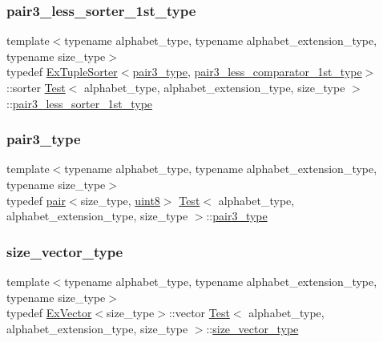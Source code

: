 \subsubsection{\texorpdfstring{pair3\+\_\+less\+\_\+sorter\+\_\+1st\+\_\+type}{pair3\_less\_sorter\_1st\_type}}
{\footnotesize\ttfamily template$<$typename alphabet\+\_\+type, typename alphabet\+\_\+extension\+\_\+type, typename size\+\_\+type$>$ \\
typedef \hyperlink{struct_ex_tuple_sorter}{Ex\+Tuple\+Sorter}$<$\hyperlink{class_test_a9c312a6616c86eaf224d04d298f58ed4}{pair3\+\_\+type}, \hyperlink{class_test_a5ebabea22d5111680c158fb28c7cc935}{pair3\+\_\+less\+\_\+comparator\+\_\+1st\+\_\+type}$>$\+::sorter \hyperlink{class_test}{Test}$<$ alphabet\+\_\+type, alphabet\+\_\+extension\+\_\+type, size\+\_\+type $>$\+::\hyperlink{class_test_aa25f2080d593eb18d6e5e475d99bac17}{pair3\+\_\+less\+\_\+sorter\+\_\+1st\+\_\+type}\hspace{0.3cm}{\ttfamily [private]}}

\mbox{\label{class_test_a9c312a6616c86eaf224d04d298f58ed4}} 
\subsubsection{\texorpdfstring{pair3\+\_\+type}{pair3\_type}}
{\footnotesize\ttfamily template$<$typename alphabet\+\_\+type, typename alphabet\+\_\+extension\+\_\+type, typename size\+\_\+type$>$ \\
typedef \hyperlink{structpair}{pair}$<$size\+\_\+type, \hyperlink{types_8h_a115946cb5fc5879545e9ccea096a6031}{uint8}$>$ \hyperlink{class_test}{Test}$<$ alphabet\+\_\+type, alphabet\+\_\+extension\+\_\+type, size\+\_\+type $>$\+::\hyperlink{class_test_a9c312a6616c86eaf224d04d298f58ed4}{pair3\+\_\+type}\hspace{0.3cm}{\ttfamily [private]}}

\mbox{\label{class_test_a9290f9f05f2aac6555e7366cf214d186}} 
\subsubsection{\texorpdfstring{size\+\_\+vector\+\_\+type}{size\_vector\_type}}
{\footnotesize\ttfamily template$<$typename alphabet\+\_\+type, typename alphabet\+\_\+extension\+\_\+type, typename size\+\_\+type$>$ \\
typedef \hyperlink{struct_ex_vector}{Ex\+Vector}$<$size\+\_\+type$>$\+::vector \hyperlink{class_test}{Test}$<$ alphabet\+\_\+type, alphabet\+\_\+extension\+\_\+type, size\+\_\+type $>$\+::\hyperlink{class_test_a9290f9f05f2aac6555e7366cf214d186}{size\+\_\+vector\+\_\+type}\hspace{0.3cm}{\ttfamily [private]}}

